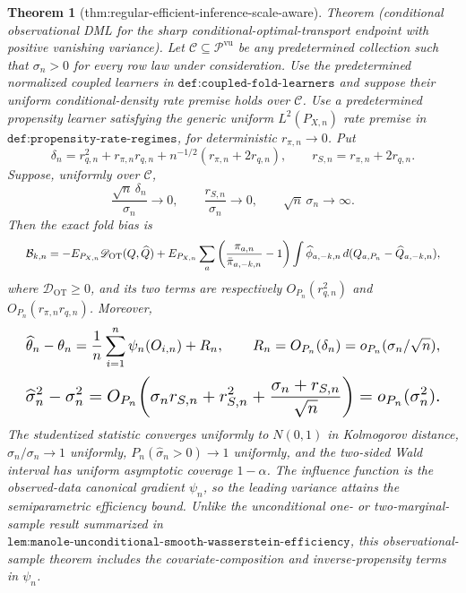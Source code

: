 \documentclass{article}
\newtheorem{theorem}{Theorem}
\begin{document}
\begin{theorem}[thm:regular-efficient-inference-scale-aware]\label{thm:regular-efficient-inference-scale-aware}
Theorem (conditional observational DML for the sharp conditional-optimal-transport endpoint with positive vanishing variance). Let \(\mathscr C\subseteq\mathscr P^{\mathrm{vu}}\) be any predetermined collection such that \(\sigma_n>0\) for every row law under consideration. Use the predetermined normalized coupled learners in \(\texttt{def:coupled-fold-learners}\) and suppose their uniform conditional-density rate premise holds over \(\mathscr C\). Use a predetermined propensity learner satisfying the generic uniform \(L^2(P_{X,n})\) rate premise in \(\texttt{def:propensity-rate-regimes}\), for deterministic \(r_{\pi,n}\to0\). Put
\[
\delta_n=r_{q,n}^2+r_{\pi,n}r_{q,n}+n^{-1/2}(r_{\pi,n}+2r_{q,n}),\qquad r_{S,n}=r_{\pi,n}+2r_{q,n}.
\]
Suppose, uniformly over \(\mathscr C\),
\[
\frac{\sqrt n\,\delta_n}{\sigma_n}\to0,\qquad \frac{r_{S,n}}{\sigma_n}\to0,\qquad \sqrt n\,\sigma_n\to\infty.
\]
Then the exact fold bias is
\[
\makebox[\linewidth][c]{\resizebox{0.98\linewidth}{!}{\par\noindent \makebox[\linewidth][c]{\resizebox{0.98\linewidth}{!}{\(\displaystyle \displaystyle \mathcal B_{k,n}=-E_{P_{X,n}}\mathscr D_{\mathrm{OT}}(Q,\widehat Q)+E_{P_{X,n}}\sum_a\left(\frac{\pi_{a,n}}{\bar\pi_{a,-k,n}}-1\right)\int\widehat\phi_{a,-k,n}\,d(Q_{a,P_n}-\widehat Q_{a,-k,n}),\)}}\par\noindent}}
\]
where \(\mathscr D_{\mathrm{OT}}\ge0\), and its two terms are respectively \(O_{P_n}(r_{q,n}^2)\) and \(O_{P_n}(r_{\pi,n}r_{q,n})\). Moreover,
\[
\makebox[\linewidth][c]{\resizebox{0.98\linewidth}{!}{\par\noindent \makebox[\linewidth][c]{\resizebox{0.98\linewidth}{!}{\(\displaystyle \displaystyle \widehat\theta_n-\theta_n=\frac1n\sum_{i=1}^n\psi_n(O_{i,n})+R_n,\qquad R_n=O_{P_n}(\delta_n)=o_{P_n}(\sigma_n/\sqrt n),\)}}\par\noindent}}
\]
\[
\makebox[\linewidth][c]{\resizebox{0.98\linewidth}{!}{\par\noindent \makebox[\linewidth][c]{\resizebox{0.98\linewidth}{!}{\(\displaystyle \displaystyle \widehat\sigma_n^2-\sigma_n^2=O_{P_n}\!\left(\sigma_n r_{S,n}+r_{S,n}^2+\frac{\sigma_n+r_{S,n}}{\sqrt n}\right)=o_{P_n}(\sigma_n^2).\)}}\par\noindent}}
\]
The studentized statistic converges uniformly to \(N(0,1)\) in Kolmogorov distance, \(\widehat\sigma_n/\sigma_n\to1\) uniformly, \(P_n(\widehat\sigma_n>0)\to1\) uniformly, and the two-sided Wald interval has uniform asymptotic coverage \(1-\alpha\). The influence function is the observed-data canonical gradient \(\psi_n\), so the leading variance attains the semiparametric efficiency bound. Unlike the unconditional one- or two-marginal-sample result summarized in \(\texttt{lem:manole-unconditional-smooth-wasserstein-efficiency}\), this observational-sample theorem includes the covariate-composition and inverse-propensity terms in \(\psi_n\).
\end{theorem}
\end{document}
